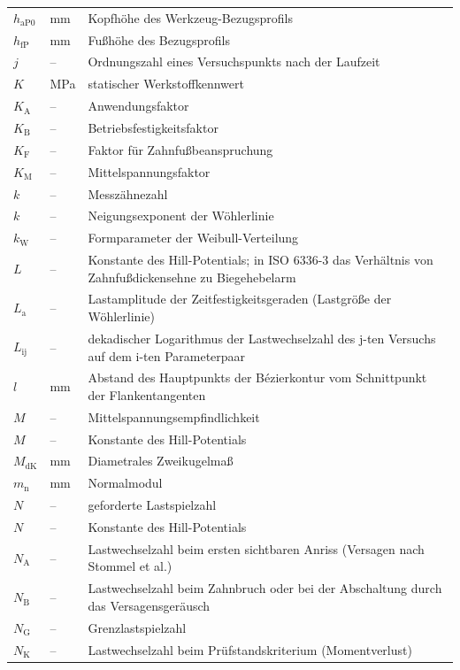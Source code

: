 \begin{longtable}{llL{0.66\textwidth}}
    $h_{\mathrm{aP0}}$ & mm & Kopfhöhe des Werkzeug-Bezugsprofils \\
    $h_{\mathrm{fP}}$ & mm & Fußhöhe des Bezugsprofils \\
    $j$ & -- & Ordnungszahl eines Versuchspunkts nach der Laufzeit \\
    $K$ & MPa & statischer Werkstoffkennwert \\
    $K_{\mathrm{A}}$ & -- & Anwendungsfaktor \\
    $K_{\mathrm{B}}$ & -- & Betriebsfestigkeitsfaktor \\
    $K_{\mathrm{F}}$ & -- & Faktor für Zahnfußbeanspruchung \\
    $K_{\mathrm{M}}$ & -- & Mittelspannungsfaktor \\
    $k$ & -- & Messzähnezahl \\
    $k$ & -- & Neigungsexponent der Wöhlerlinie \\
    $k_{\mathrm{W}}$ & -- & Formparameter der Weibull-Verteilung \\
    $L$ & -- & Konstante des Hill-Potentials; in ISO 6336-3 das Verhältnis von Zahnfußdickensehne zu Biegehebelarm \\
    $L_{\mathrm{a}}$ & -- & Lastamplitude der Zeitfestigkeitsgeraden (Lastgröße der Wöhlerlinie) \\
    $L_{\mathrm{ij}}$ & -- & dekadischer Logarithmus der Lastwechselzahl des j-ten Versuchs auf dem i-ten Parameterpaar \\
    $l$ & mm & Abstand des Hauptpunkts der Bézierkontur vom Schnittpunkt der Flankentangenten \\
    $M$ & -- & Mittelspannungsempfindlichkeit \\
    $M$ & -- & Konstante des Hill-Potentials \\
    $M_{\mathrm{dK}}$ & mm & Diametrales Zweikugelmaß \\
    $m_{\mathrm{n}}$ & mm & Normalmodul \\
    $N$ & -- & geforderte Lastspielzahl \\
    $N$ & -- & Konstante des Hill-Potentials \\
    $N_{\mathrm{A}}$ & -- & Lastwechselzahl beim ersten sichtbaren Anriss (Versagen nach Stommel et al.) \\
    $N_{\mathrm{B}}$ & -- & Lastwechselzahl beim Zahnbruch oder bei der Abschaltung durch das Versagensgeräusch \\
    $N_{\mathrm{G}}$ & -- & Grenzlastspielzahl \\
    $N_{\mathrm{K}}$ & -- & Lastwechselzahl beim Prüfstandskriterium (Momentverlust) \\

\end{longtable}
